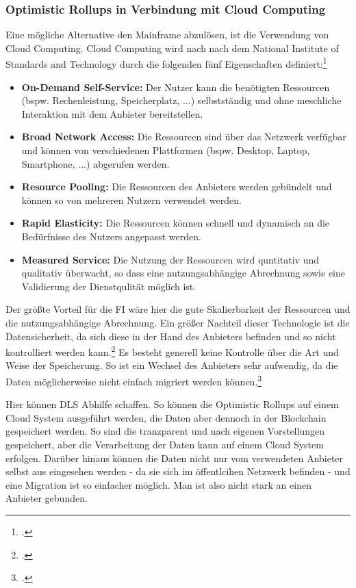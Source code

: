 \subsubsection{Optimistic Rollups in Verbindung mit Cloud Computing}
Eine mögliche Alternative den Mainframe abzulösen, ist die Verwendung von Cloud Computing.
Cloud Computing wird nach nach dem National Institute of Standards and Technology durch die folgenden fünf Eigenschaften definiert:\footcite[Vgl. hierzu und zum Folgenden][5]{q11}
\begin{itemize}
    \item \textbf{On-Demand Self-Service:} 
    Der Nutzer kann die benötigten Ressourcen (bspw. Rechenleistung, Speicherplatz, ...) selbstständig und ohne meschliche Interaktion mit dem Anbieter bereitstellen.
    \item \textbf{Broad Network Access:}
    Die Ressourcen sind über das Netzwerk verfügbar und können von verschiedenen Plattformen (bspw. Desktop, Laptop, Smartphone, ...) abgerufen werden.
    \item \textbf{Resource Pooling:}
    Die Ressourcen des Anbieters werden gebündelt und können so von mehreren Nutzern verwendet werden.
    \item \textbf{Rapid Elasticity:}
    Die Ressourcen können schnell und dynamisch an die Bedürfnisse des Nutzers angepasst werden.
    \item \textbf{Measured Service:}
    Die Nutzung der Ressourcen wird quntitativ und qualitativ überwacht, so dass eine nutzungsabhängige Abrechnung sowie eine Validierung der Dienstqulität möglich ist.
\end{itemize}

\noindent
Der größte Vorteil für die FI wäre hier die gute Skalierbarkeit der Ressourcen und die nutzungsabhängige Abrechnung.
\bigbreak
\noindent
Ein größer Nachteil dieser Technologie ist die Datensicherheit, da sich diese in der Hand des Anbieters befinden und so nicht kontrolliert werden kann.\footcite[Vgl. hierzu und zum Folgenden][99]{q10}
Es besteht generell keine Kontrolle über die Art und Weise der Speicherung.
So ist ein Wechsel des Anbieters sehr aufwendig, da die Daten möglicherweise nicht einfach migriert werden können.\footcite[Vgl.][]{w28}

\noindent
Hier können DLS Abhilfe schaffen.
So können die Optimistic Rollups auf einem Cloud System ausgeführt werden, die Daten aber dennoch in der Blockchain gespeichert werden.
So sind die tranzparent und nach eigenen Vorstellungen gespeichert, aber die Verarbeitung der Daten kann auf einem Cloud System erfolgen.
Darüber hinaus können die Daten nicht nur vom verwendeten Anbieter selbst aus eingesehen werden - da sie sich im öffentlcihen Netzwerk befinden - und eine Migration ist so einfacher möglich.
Man ist also nicht stark an einen Anbieter gebunden.

